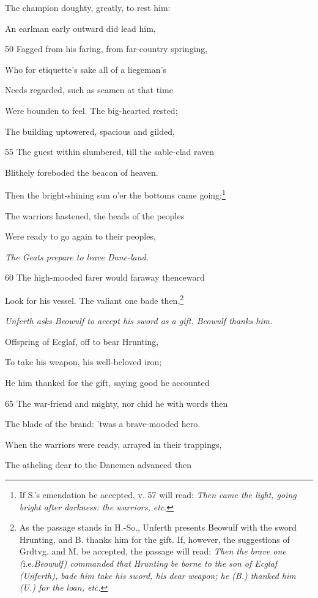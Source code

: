 The champion doughty, greatly, to rest him:

An earlman early outward did lead him,

50
Fagged from his faring, from far-country springing,

Who for etiquette’s sake all of a liegeman’s

Needs regarded, such as seamen at that time

Were bounden to feel. The big-hearted rested;

The building uptowered, spacious and gilded,

55
The guest within slumbered, till the sable-clad raven

Blithely foreboded the beacon of heaven.

Then the bright-shining sun o’er the bottoms came going;\footnote{If S.’s emendation be accepted, v. 57 will read: \emph{Then came the light,
going bright after darkness: the warriors, etc}.}

The warriors hastened, the heads of the peoples

Were ready to go again to their peoples,

\emph{The Geats prepare
to leave Dane-land.}

60
The high-mooded farer would faraway thenceward

Look for his vessel. The valiant one bade then,\footnote{As the passage stands in H.-So., Unferth presents Beowulf with the sword
Hrunting, and B. thanks him for the gift. If, however, the suggestions of Grdtvg.
and M. be accepted, the passage will read: \emph{Then the brave one (}i.e.\emph{Beowulf)
commanded that Hrunting be borne to the son of Ecglaf (Unferth), bade him
take his sword, his dear weapon; he (B.) thanked him (U.) for the loan, etc}.}

\emph{Unferth asks Beowulf
to accept his
sword as a gift.
Beowulf thanks
him.}

Offspring of Ecglaf, off to bear Hrunting,

To take his weapon, his well-beloved iron;

He him thanked for the gift, saying good he accounted

65
The war-friend and mighty, nor chid he with words then

The blade of the brand: ’twas a brave-mooded hero.

When the warriors were ready, arrayed in their trappings,

The atheling dear to the Danemen advanced then

